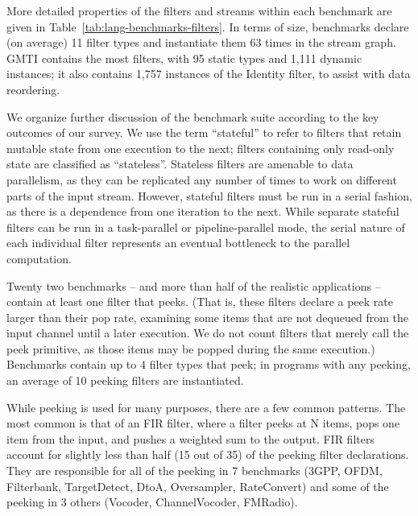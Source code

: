 More detailed properties of the filters and streams within each
benchmark are given in Table~\ref{tab:lang-benchmarks-filters}.  In
terms of size, benchmarks declare (on average) 11 filter types and
instantiate them 63 times in the stream graph.  GMTI contains the most
filters, with 95 static types and 1,111 dynamic instances; it also
contains 1,757 instances of the Identity filter, to assist with data
reordering.

We organize further discussion of the benchmark suite according to the
key outcomes of our survey.  We use the term ``stateful'' to refer to
filters that retain mutable state from one execution to the next;
filters containing only read-only state are classified as
``stateless''.  Stateless filters are amenable to data parallelism, as
they can be replicated any number of times to work on different parts
of the input stream.  However, stateful filters must be run in a
serial fashion, as there is a dependence from one iteration to the
next.  While separate stateful filters can be run in a task-parallel
or pipeline-parallel mode, the serial nature of each individual filter
represents an eventual bottleneck to the parallel computation.

\mybegin

  Twenty two
benchmarks -- and more than half of the realistic applications --
contain at least one filter that peeks.  (That is, these filters
declare a peek rate larger than their pop rate, examining some items
that are not dequeued from the input channel until a later execution.
We do not count filters that merely call the peek primitive, as those
items may be popped during the same execution.)  Benchmarks contain up
to 4 filter types that peek; in programs with any peeking, an average
of 10 peeking filters are instantiated.

While peeking is used for many purposes, there are a few common
patterns.  The most common is that of an FIR filter, where a filter
peeks at N items, pops one item from the input, and pushes a weighted
sum to the output.  FIR filters account for slightly less than half
(15 out of 35) of the peeking filter declarations.  They are
responsible for all of the peeking in 7 benchmarks (3GPP, OFDM,
Filterbank, TargetDetect, DtoA, Oversampler, RateConvert) and some of
the peeking in 3 others (Vocoder, ChannelVocoder, FMRadio).


